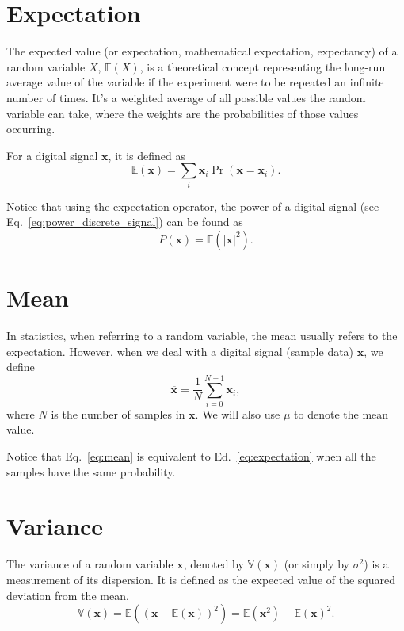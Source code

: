 
\section{Expectation}
The expected value (or expectation, mathematical expectation,
expectancy) of a random variable $X$, $\mathbb{E}(X)$, is a
theoretical concept representing the long-run average value of the
variable if the experiment were to be repeated an infinite number of
times. It's a weighted average of all possible values the random
variable can take, where the weights are the probabilities of those
values occurring.

For a digital signal $\mathbf{x}$, it is defined as
\begin{equation}
  \mathbb{E}(\mathbf{x})=\sum_i\mathbf{x}_i\Pr(\mathbf{x}=\mathbf{x}_i).
  \label{eq:expectation}
\end{equation}

Notice that using the expectation operator, the power of a digital
signal (see Eq.~\ref{eq:power_discrete_signal}) can be found as
\begin{equation}
  P(\mathbf{x}) = \mathbb{E}(|\mathbf{x}|^2).
  \label{eq:power_as_expectation}
\end{equation}

\section{Mean}
In statistics, when referring to a random variable, the mean usually
refers to the expectation. However, when we deal with a digital signal
(sample data) $\mathbf{x}$, we define
\begin{equation}
  \overline{\mathbf{x}} = \frac{1}{N}\sum_{i=0}^{N-1}\mathbf{x}_i,
  \label{eq:mean}
\end{equation}
where $N$ is the number of samples in $\mathbf{x}$. We will also use
$\mu$ to denote the mean value.

Notice that Eq.~\ref{eq:mean} is equivalent to
Ed.~\ref{eq:expectation} when all the samples have the same
probability.

\section{Variance}
\label{sec:variance}

The variance of a random variable $\mathbf{x}$, denoted by
$\mathbb{V}(\mathbf{x})$ (or simply by $\sigma^2$) is a measurement of
its dispersion. It is defined as the expected value of the squared
deviation from the mean,
\begin{equation}
  \mathbb{V}(\mathbf{x}) = \mathbb{E}\left((\mathbf{x} - \mathbb{E}(\mathbf{x}))^2 \right) = \mathbb{E}(\mathbf{x}^2)-\mathbb{E}(\mathbf{x})^2.
  \label{eq:variance}
\end{equation}

